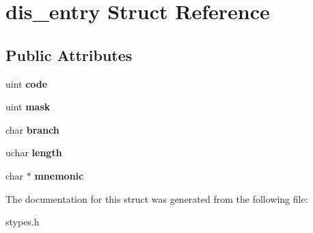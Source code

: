 \hypertarget{structdis__entry}{
\section{dis\_\-entry Struct Reference}
\label{structdis__entry}
}
\subsection*{Public Attributes}
\begin{DoxyCompactItemize}
\item 
\hypertarget{structdis__entry_a0eefc2c174f1c38d4119a371431440bf}{
uint {\bfseries code}}
\label{structdis__entry_a0eefc2c174f1c38d4119a371431440bf}

\item 
\hypertarget{structdis__entry_ac0dde18f7f844e57386791b1324ebdca}{
uint {\bfseries mask}}
\label{structdis__entry_ac0dde18f7f844e57386791b1324ebdca}

\item 
\hypertarget{structdis__entry_a27b5ed80ac1be7cee1d44a61501b5082}{
char {\bfseries branch}}
\label{structdis__entry_a27b5ed80ac1be7cee1d44a61501b5082}

\item 
\hypertarget{structdis__entry_a6e9084d688366103cfdd5cedb061df9c}{
uchar {\bfseries length}}
\label{structdis__entry_a6e9084d688366103cfdd5cedb061df9c}

\item 
\hypertarget{structdis__entry_a1294a8cfe957e332f4f267c960ea6e73}{
char $\ast$ {\bfseries mnemonic}}
\label{structdis__entry_a1294a8cfe957e332f4f267c960ea6e73}

\end{DoxyCompactItemize}


The documentation for this struct was generated from the following file:\begin{DoxyCompactItemize}
\item 
stypes.h\end{DoxyCompactItemize}
